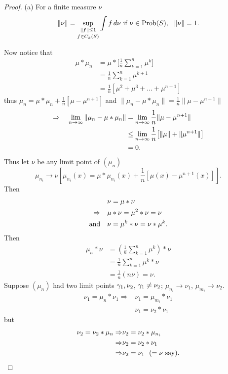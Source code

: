 \begin{proof} (a) For a finite measure $\nu$
\[
     \| \nu \| = \underset{f \in C_k(S)}{\sup_{\|f\| \le 1}}
          \int f\, d\nu \hbox{ if }
          \nu \in \hbox{Prob}(S), \ \ \| \nu\| = 1.
\]

Now notice that
\[
\begin{aligned}
       \mu * \mu_n &= \mu * \bigg[ \frac{1}{n}
          \sum^n_{k=1} \mu^k \bigg]                            \\
       &= \frac{1}{n} \sum^n_{k=1} \mu^{k+1}                   \\
       &= \frac{1}{n} [\mu^2 + \mu^3 + \ldots
               + \mu^{n+1}]
\end{aligned}
\]
thus $\mu_n = \mu * \mu_n + \frac{1}{n} [\mu - \mu^{n+1}]$ and
$\|\mu_n - \mu*\mu_n \| = \frac{1}{n} \|\mu-\mu^{n+1}\|$
\[
\begin{aligned}
       \Rightarrow \quad \lim_{n\to\infty}
          \|\mu_n - \mu*\mu_n\| &= \lim_{n\to\infty} \frac{1}{n}
               \|\mu-\mu^{n+1}\|                               \\
       &\le \lim_{n\to\infty} \frac{1}{n} \big[
               \|\mu\| + \|\mu^{n+1}\| \big]                   \\
       &= 0.
\end{aligned}
\]
Thus let $\nu$ be any limit point of $(\mu_n)$
\[
     \mu_{n_i} \to \nu \left[ \mu_{n_i}(x)
          = \mu*\mu_{n_i}(x) + \frac{1}{n}
          [\mu(x) - \mu^{n+1}(x)] \right].
\]
Then
\[
\begin{aligned}
       &\nu = \mu * \nu                            \\
       \Rightarrow \quad &\mu * \nu = \mu^2 * \nu = \nu    \\
       \hbox{and} \quad &\nu = \mu^k * \nu = \nu * \mu^k.
\end{aligned}
\]
Then
\[
\begin{aligned}
       \mu_n * \nu &= \left( \frac{1}{n} \sum^n_{k=1}
               \mu^k \right) * \nu                             \\
       &= \frac{1}{n} \sum^n_{k=1}
               \mu^k * \nu                                     \\
       &= \frac{1}{n} (n\nu) = \nu.
\end{aligned}
\]
Suppose $(\mu_n)$ had two limit points $\gamma_1,\nu_2$, $\gamma_1 \not=
\nu_2$; $\mu_{n_i} \to \nu_1$, $\mu_{m_i} \to \nu_2$.
\[
\begin{aligned}
       \nu_1 = \mu_n * \nu_1 \Rightarrow &\nu_1 = \mu_{m_i} * \nu_1  \\
             &\nu_1 = \nu_2 * \nu_1
\end{aligned}
\]
but
\[
\begin{aligned}
       \nu_2 = \nu_2 * \mu_n \Rightarrow &\nu_2 = \nu_2 * \mu_{n_i} \\
       \Rightarrow &\nu_2 = \nu_2 * \nu_1                            \\
       \Rightarrow &\nu_2 = \nu_1 \ \  (= \nu \hbox{ say}).
\end{aligned}
\]


\end{proof}
